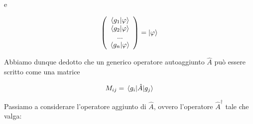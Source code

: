 e

	\begin{equation}
		\left ( \begin{array}{c}
				\braket{g_1}{\varphi} \\
				\braket{g_2}{\varphi} \\
				... \\
				\braket{g_n}{\varphi} \\
			\end{array}
		\right ) = \ket{\varphi}
	\end{equation}

Abbiamo dunque dedotto che un generico operatore autoaggiunto $\hat{A}$ può essere scritto come una matrice

	\begin{equation}
		M_{ij} = \mel{g_i}{\hat{A}}{g_j} 
	\end{equation}

Passiamo a considerare l'operatore aggiunto di $\hat{A}$, ovvero l'operatore $\hat{A}^{\dagger}$ tale che valga:
